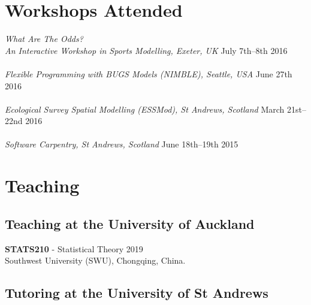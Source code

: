 \documentclass[10pt,letter]{article}
\begin{document}
  
\section*{Workshops Attended}
\vspace{1mm}
{\sl What Are The Odds? \\ An Interactive Workshop in Sports Modelling, Exeter, UK} \hfill July 7th--8th 2016\\
\hdashrule[0.5ex]{4cm}{1pt}{1pt}\\
{\sl Flexible Programming with BUGS Models (NIMBLE), Seattle, USA} \hfill June 27th 2016\\
\hdashrule[0.5ex]{4cm}{1pt}{1pt}\\
{\sl Ecological Survey Spatial Modelling (ESSMod), St Andrews, Scotland} \hfill March 21st--22nd 2016\\
 \hdashrule[0.5ex]{4cm}{1pt}{1pt}\\
 {\sl Software Carpentry, St Andrews, Scotland} \hfill June 18th--19th 2015\\
 \newpage
 \section*{Teaching}
\vspace{1mm}
 \subsection*{Teaching at the University of Auckland}
 \vspace{1mm}

 \textbf{STATS210} - Statistical Theory \hfill{2019} \\
 Southwest University (SWU), Chongqing, China.
 
\vspace{1mm}
 \subsection*{Tutoring at the University of St Andrews}
 \vspace{1mm}
 
\end{document}
